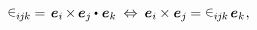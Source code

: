\nopagebreak\vspace{-0.3em}
\begin{equation*}
\permutationsparitysymbols{i\hspace{-0.1ex}j\hspace{-0.1ex}k} \hspace{-0.15ex} = \hspace{.15ex}
\hspace{.1ex} \bm{e}_i \hspace{-0.2ex} \times \hspace{-0.2ex} \bm{e}_j \hspace{-0.1ex} \dotp \hspace{.12ex} \bm{e}_k
\:\Leftrightarrow\:
\bm{e}_i \hspace{-0.1ex} \times \bm{e}_j \hspace{-0.12ex}
= \permutationsparitysymbols{i\hspace{-0.1ex}j\hspace{-0.1ex}k} \hspace{.2ex} \bm{e}_k
\hspace{.1ex} ,
\end{equation*}\vspace{-1.6em}
